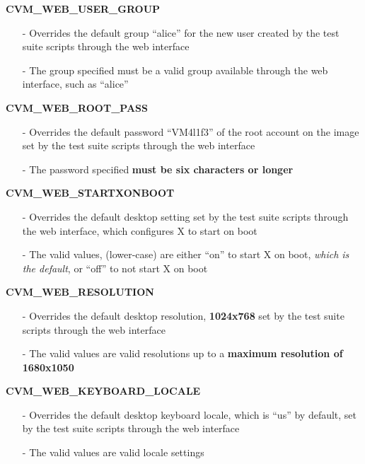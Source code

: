 \begin{description}
\item {\bf CVM\_WEB\_USER\_GROUP}
		\begin{itemize}
		\item[-]	Overrides the default group ``alice'' for the new user created 
				by the test suite scripts through the web interface
		\item[-]	The group specified must be a valid group available
				through the web interface, such as ``alice''
		\end{itemize}

\item {\bf CVM\_WEB\_ROOT\_PASS}
		\begin{itemize}
		\item[-]	Overrides the default password ``VM4l1f3'' of the root account
				on the \cernvm image set by the test suite scripts through the
				web interface
		\item[-]	The password specified {\bf must be six characters or longer}
		\end{itemize}
		
\item {\bf CVM\_WEB\_STARTXONBOOT}
		\begin{itemize}
		\item[-]	Overrides the default \cernvm desktop setting set by the test 
				suite scripts through the web interface, which configures X to
				start on boot
		\item[-]	The valid values, (lower-case) are either ``on'' to start X on boot,
				\emph{which is the default}, or ``off'' to not start X on boot		
		\end{itemize}
				
\item {\bf CVM\_WEB\_RESOLUTION}
		\begin{itemize}
		\item[-]	Overrides the default \cernvm desktop resolution, {\bf 1024x768} set by
				the test suite scripts through the web interface
		\item[-]	The valid values are valid resolutions up to a {\bf maximum resolution
				of 1680x1050}
		\end{itemize}

\item {\bf CVM\_WEB\_KEYBOARD\_LOCALE}
		\begin{itemize}
		\item[-]	Overrides the default \cernvm desktop keyboard locale, which is ``us'' by
				default, set by the test suite scripts through the web interface
		\item[-]	The valid values are valid locale settings
		\end{itemize}


\end{description}
